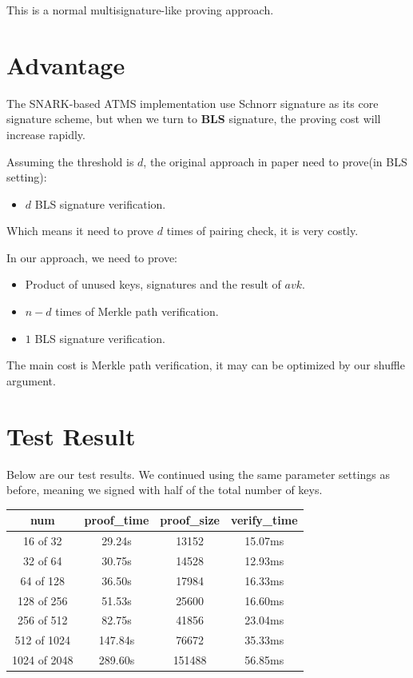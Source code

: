 \documentclass{article}
\begin{document}
This is a normal multisignature-like proving approach.


\section{Advantage}

The SNARK-based ATMS implementation use Schnorr signature as its core signature scheme, but when we turn to \textbf{BLS} signature, the proving cost will increase rapidly.

Assuming the threshold is $d$, the original approach in paper need to prove(in BLS setting):

\begin{itemize}
    \item $d$ BLS signature verification.
\end{itemize}

Which means it need to prove $d$ times of pairing check, it is very costly.


In our approach, we need to prove:

\begin{itemize}
    \item Product of unused keys, signatures and the result of $avk$.
    \item $n-d$ times of Merkle path verification.
    \item $1$ BLS signature verification.
\end{itemize}


The main cost is Merkle path verification, it may can be optimized by our shuffle argument.

\section{Test Result}

Below are our test results. We continued using the same parameter settings as before, meaning we signed with half of the total number of keys. 

\begin{table}[htbp]
    \centering
    \renewcommand{\arraystretch}{1.1} %
    \setlength{\tabcolsep}{10pt}      %
    \begin{tabular}{c|c|c|c} \hline
        \textbf{num} & \textbf{proof\_time} & \textbf{proof\_size} & \textbf{verify\_time} \\ \hline
        16 of 32    & 29.24s  & 13152  & 15.07ms  \\
        32 of 64    & 30.75s  & 14528  & 12.93ms  \\
        64 of 128   & 36.50s  & 17984  & 16.33ms  \\
        128 of 256  & 51.53s  & 25600  & 16.60ms  \\
        256 of 512  & 82.75s  & 41856  & 23.04ms  \\
        512 of 1024 & 147.84s & 76672  & 35.33ms  \\
        1024 of 2048 & 289.60s & 151488 & 56.85ms  \\ \hline
    \end{tabular}
    \label{tab:example_benchmark_selected}
\end{table}
\end{document}
